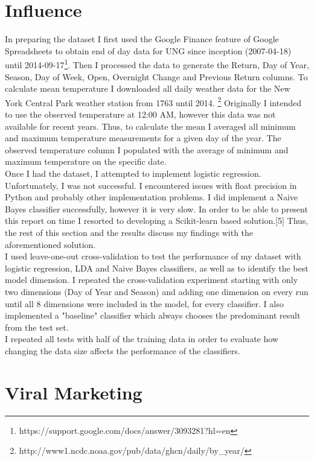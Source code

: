 \documentclass[conference,letterpaper]{IEEEtran}
\begin{document}
\section{Influence}
In preparing the dataset I first used the Google Finance feature of Google Spreadsheets to obtain end of day data for UNG
since inception (2007-04-18) until 2014-09-17\footnote{https://support.google.com/docs/answer/3093281?hl=en}. Then I processed 
the data to generate the Return, Day of Year, Season, Day of Week, Open, Overnight Change and Previous Return columns.
To calculate mean temperature I downloaded all daily weather data for the New York Central Park weather station from 1763 until 2014.
\footnote{http://www1.ncdc.noaa.gov/pub/data/ghcn/daily/by\_year/}
Originally I intended to use the observed temperature at 12:00 AM, however this data was not available for recent years.
Thus, to calculate the mean I averaged all minimum and maximum temperature measurements for a given day of the year. 
The observed temperature column I populated with the average of minimum and maximum temperature on the specific date. \\
\indent Once I had the dataset, I attempted to implement logistic regression. Unfortunately, I was not successful. I encountered
issues with float precision in Python and probably other implementation problems. I did implement a Naive Bayes classifier
successfully, however it is very slow.  In order to be able to present this report on time I resorted to developing 
a Scikit-learn based solution.[5] Thus, the rest of this section and the results discuss my findings with the aforementioned solution. \\
\indent I used leave-one-out cross-validation to test the performance of my dataset with logistic regression, LDA and Naive Bayes
classifiers, as well as to identify the best model dimension. I repeated the cross-validation experiment starting with only two
dimensions (Day of Year and Season) and adding one dimension on every run until all 8 dimensions were included in the model, for
every classifier. I also implemented a "baseline" classifier which always chooses the predominant result from the test set. \\
\indent I repeated all tests with half of the training data in order to evaluate how changing the data size affects the
performance of the classifiers. \\

\section{Viral Marketing}
\end{document}
